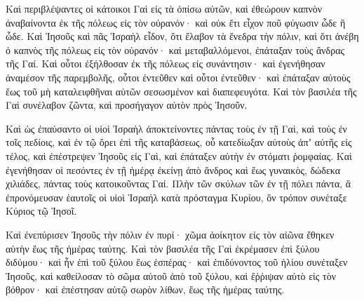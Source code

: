 {Καὶ περιβλέψαντες οἱ κάτοικοι Γαὶ εἰς τὰ ὀπίσω αὐτῶν, καὶ ἐθεώρουν καπνὸν ἀναβαίνοντα ἐκ τῆς πόλεως εἰς τὸν οὐρανόν· καὶ οὐκ ἔτι εἶχον ποῦ φύγωσιν ὧδε ἢ ὧδε.
Καὶ Ἰησοῦς καὶ πᾶς Ἰσραὴλ εἶδον, ὅτι ἔλαβον τὰ ἔνεδρα τὴν πόλιν, καὶ ὅτι ἀνέβη ὁ καπνὸς τῆς πόλεως εἰς τὸν οὐρανόν· καὶ μεταβαλλόμενοι, ἐπάταξαν τοὺς ἄνδρας τῆς Γαί.
Καὶ οὗτοι ἐξήλθοσαν ἐκ τῆς πόλεως εἰς συνάντησιν· καὶ ἐγενήθησαν ἀναμέσον τῆς παρεμβολῆς, οὗτοι ἐντεῦθεν καὶ οὗτοι ἐντεῦθεν· καὶ ἐπάταξαν αὐτοὺς ἕως τοῦ μὴ καταλειφθῆναι αὐτῶν σεσωσμένον καὶ διαπεφευγότα.
Καὶ τὸν βασιλέα τῆς Γαὶ συνέλαβον ζῶντα, καὶ προσήγαγον αὐτὸν πρὸς Ἰησοῦν.
\par }{\PP {}Καὶ ὡς ἐπαύσαντο οἱ υἱοὶ Ἰσραὴλ ἀποκτείνοντες πάντας τοὺς ἐν τῇ Γαὶ, καὶ τοὺς ἐν τοῖς πεδίοις, καὶ ἐν τῷ ὄρει ἐπὶ τῆς καταβάσεως, οὗ κατεδίωξαν αὐτοὺς ἀπʼ αὐτῆς εἰς τέλος, καὶ ἐπέστρεψεν Ἰησοῦς εἰς Γαὶ, καὶ ἐπάταξεν αὐτὴν ἐν στόματι ῥομφαίας.
Καὶ ἐγενήθησαν οἱ πεσόντες ἐν τῇ ἡμέρᾳ ἐκείνῃ ἀπὸ ἄνδρος καὶ ἕως γυναικὸς, δώδεκα χιλιάδες, πάντας τοὺς κατοικοῦντας Γαί.
Πλὴν τῶν σκύλων τῶν ἐν τῇ πόλει πάντα, ἃ ἐπρονόμευσαν ἑαυτοῖς οἱ υἱοὶ Ἰσραήλ κατὰ πρόσταγμα Κυρίου, ὃν τρόπον συνέταξε Κύριος τῷ Ἰησοῖ.
\par }{\PP {}Καὶ ἐνεπύρισεν Ἰησοῦς τὴν πόλιν ἐν πυρί· χῶμα ἀοίκητον εἰς τὸν αἰῶνα ἔθηκεν αὐτὴν ἕως τῆς ἡμέρας ταύτης.
Καὶ τὸν βασιλέα τῆς Γαὶ ἐκρέμασεν ἐπὶ ξύλου διδύμου· καὶ ἦν ἐπὶ τοῦ ξύλου ἕως ἑσπέρας· καὶ ἐπιδύνοντος τοῦ ἡλίου συνέταξεν Ἰησοῦς, καὶ καθείλοσαν τὸ σῶμα αὐτοῦ ἀπὸ τοῦ ξύλου, καὶ ἔῤῥιψαν αὐτὸ εἰς τὸν βόθρον· καὶ ἐπέστησαν αὐτῷ σωρὸν λίθων, ἕως τῆς ἡμέρας ταύτης.

}

